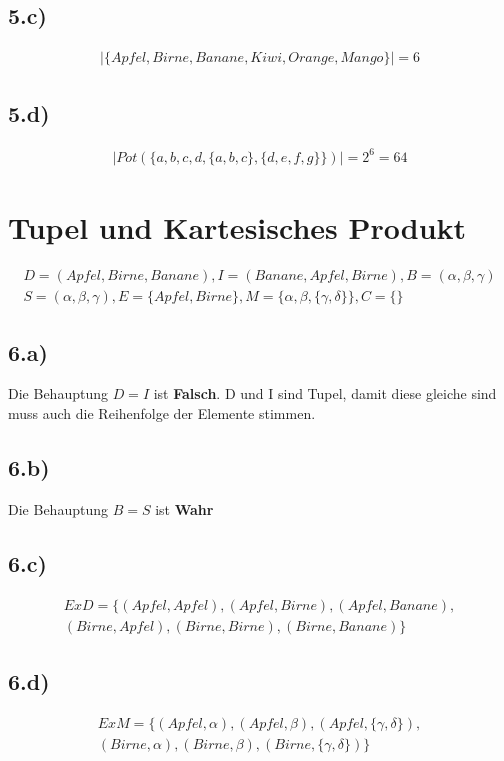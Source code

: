 \documentclass[10pt,ngerman]{scrartcl}
\begin{document}
\subsection{5.c)}
\setcounter{equation}{0}
\begin{align*}
|\{Apfel, Birne, Banane, Kiwi, Orange, Mango\}| = 6
\end{align*}

\subsection{5.d)}
\setcounter{equation}{0}
\begin{align*}
|Pot(\{a, b, c, d, \{a, b, c\}, \{d, e, f , g\}\})| = 2^6 = 64
\end{align*}

\section{Tupel und Kartesisches Produkt}
\setcounter{equation}{0}
\begin{align*}
D = (Apfel, Birne, Banane), I = (Banane, Apfel, Birne), B = (\alpha, \beta, \gamma)\\
S = (\alpha, \beta, \gamma), E = \{Apfel, Birne\}, M = \{\alpha, \beta, \{\gamma, \delta\}\}, C = \{\}
\end{align*}

\subsection{6.a)}
Die Behauptung $D = I$ ist \textbf{Falsch}. D und I sind Tupel, damit diese gleiche sind muss auch die Reihenfolge der Elemente stimmen.

\subsection{6.b)}
Die Behauptung $B = S$ ist \textbf{Wahr}

\subsection{6.c)}
\setcounter{equation}{0}
\begin{align*}
E x D = \{(Apfel,Apfel),(Apfel,Birne),(Apfel,Banane),\\(Birne,Apfel),(Birne,Birne),(Birne,Banane)\}
\end{align*}

\subsection{6.d)}
\setcounter{equation}{0}
\begin{align*}
E x M = \{(Apfel,\alpha),(Apfel,\beta),(Apfel,\{\gamma, \delta\}),\\(Birne,\alpha),(Birne,\beta),(Birne,\{\gamma, \delta\})\}
\end{align*}
\end{document}
